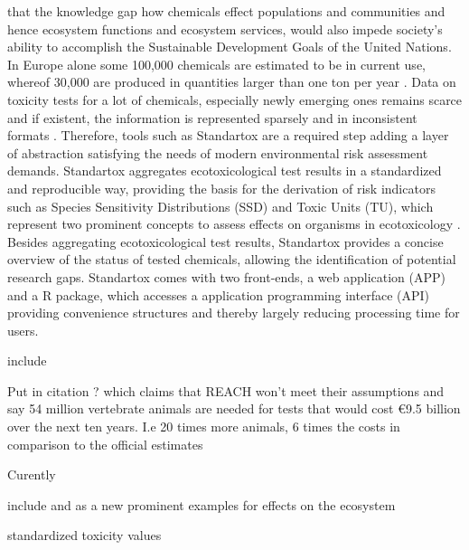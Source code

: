 that the knowledge gap how chemicals effect populations and communities and hence ecosystem functions and ecosystem services, would also impede society's ability to accomplish the Sustainable Development Goals of the United Nations. In Europe alone some 100,000 chemicals are estimated to be in current use, whereof 30,000 are produced in quantities larger than one ton per year \citep{breithaupt_costs_2006}. Data on toxicity tests for a lot of chemicals, especially newly emerging ones remains scarce and if existent, the information is represented sparsely and in inconsistent formats \citep{gessner_fostering_2016, hitchcock_improving_2018}. Therefore, tools such as Standartox are a required step adding a layer of abstraction satisfying the needs of modern environmental risk assessment demands. Standartox aggregates ecotoxicological test results in a standardized and reproducible way, providing the basis for the derivation of risk indicators such as Species Sensitivity Distributions (SSD) \citep{posthuma_species_2002} and Toxic Units (TU), which represent two prominent concepts to assess effects on organisms in ecotoxicology \citep{kefford_definition_2011, schafer_effects_2011}. Besides aggregating ecotoxicological test results, Standartox provides a concise overview of the status of tested chemicals, allowing the identification of potential research gaps. Standartox comes with two front-ends,  a web application (APP) and a R \citep{rcoreteam_language_2017} package, which accesses a application programming interface (API) providing convenience structures and thereby largely reducing processing time for users.

\iffalse

include \citep{sanchez-bayo_worldwide_2019} %

\item Put in citation \citep{hartung_chemical_2009} ? which claims that REACH won't meet their assumptions and say 54 million vertebrate animals are needed for tests that would cost €9.5 billion over the next ten years. I.e 20 times more animals, 6 times the costs in comparison to the official estimates 


Curently \citep{schafer_future_2019} 

include \citep{yamamuro_neonicotinoids_2019} and \citep{seibold_arthropod_2019} as a new prominent examples for effects on the ecosystem


    \item standardized toxicity values
    
